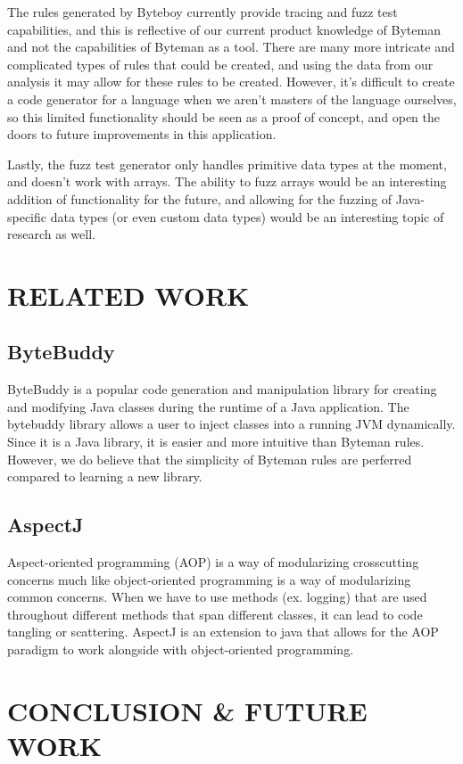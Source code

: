 \documentclass[letterpaper,twocolumn,10pt]{article}
\begin{document}
The rules generated by Byteboy currently provide tracing and fuzz test capabilities, and this is reflective of our current product knowledge of Byteman and not the capabilities of Byteman as a tool. There are many more intricate and complicated types of rules that could be created, and using the data from our analysis it may allow for these rules to be created. However, it's difficult to create a code generator for a language when we aren't masters of the language ourselves, so this limited functionality should be seen as a proof of concept, and open the doors to future improvements in this application.

Lastly, the fuzz test generator only handles primitive data types at the moment, and doesn't work with arrays. The ability to fuzz arrays would be an interesting addition of functionality for the future, and allowing for the fuzzing of Java-specific data types (or even custom data types) would be an interesting topic of research as well.

\section{RELATED WORK}

\subsection{ByteBuddy}
ByteBuddy is a popular code generation and manipulation library for creating and modifying Java classes during the runtime of a Java application\cite{bytebuddy}. The bytebuddy library allows a user to inject classes into a running JVM dynamically. Since it is a Java library, it is easier and more intuitive than Byteman rules. However, we do believe that the simplicity of Byteman rules are perferred compared to learning a new library.

\subsection{AspectJ}
Aspect-oriented programming (AOP) is a way of modularizing crosscutting concerns much like object-oriented programming is a way of modularizing common concerns\cite{aspectj}. When we have to use methods (ex. logging) that are used throughout different methods that span different classes, it can lead to code tangling or scattering. AspectJ is an extension to java that allows for the AOP paradigm to work alongside with object-oriented programming.

\section{CONCLUSION \& FUTURE WORK}
\end{document}

